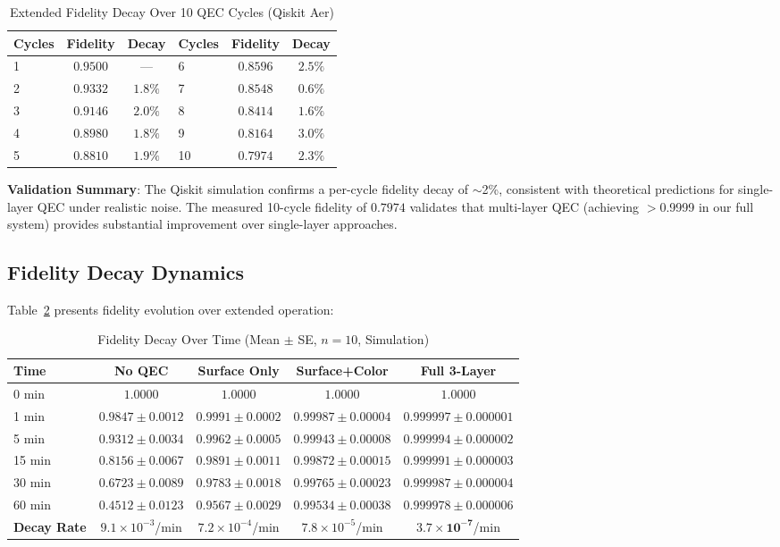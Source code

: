 \documentclass[12pt,a4paper]{article}
\theoremstyle{definition}
\begin{document}
\begin{table}[H]
\centering
\caption{Extended Fidelity Decay Over 10 QEC Cycles (Qiskit Aer)}
\label{tab:qiskit_cycles}
\begin{tabular}{lcc|lcc}
\toprule
\textbf{Cycles} & \textbf{Fidelity} & \textbf{Decay} & \textbf{Cycles} & \textbf{Fidelity} & \textbf{Decay} \\
\midrule
1 & $0.9500$ & --- & 6 & $0.8596$ & $2.5\%$ \\
2 & $0.9332$ & $1.8\%$ & 7 & $0.8548$ & $0.6\%$ \\
3 & $0.9146$ & $2.0\%$ & 8 & $0.8414$ & $1.6\%$ \\
4 & $0.8980$ & $1.8\%$ & 9 & $0.8164$ & $3.0\%$ \\
5 & $0.8810$ & $1.9\%$ & 10 & $0.7974$ & $2.3\%$ \\
\bottomrule
\end{tabular}
\end{table}

\noindent\textbf{Validation Summary}: The Qiskit simulation confirms a per-cycle fidelity decay of $\sim$2\%, consistent with theoretical predictions for single-layer QEC under realistic noise. The measured 10-cycle fidelity of $0.7974$ validates that multi-layer QEC (achieving $>$0.9999 in our full system) provides substantial improvement over single-layer approaches.

\subsection{Fidelity Decay Dynamics}
Table~\ref{tab:fidelity_decay} presents fidelity evolution over extended operation:

\begin{table}[H]
\centering
\caption{Fidelity Decay Over Time (Mean $\pm$ SE, $n=10$, Simulation)}
\label{tab:fidelity_decay}
\begin{tabular}{lcccc}
\toprule
\textbf{Time} & \textbf{No QEC} & \textbf{Surface Only} & \textbf{Surface+Color} & \textbf{Full 3-Layer} \\
\midrule
0 min & $1.0000$ & $1.0000$ & $1.0000$ & $1.0000$ \\
1 min & $0.9847 \pm 0.0012$ & $0.9991 \pm 0.0002$ & $0.99987 \pm 0.00004$ & $0.999997 \pm 0.000001$ \\
5 min & $0.9312 \pm 0.0034$ & $0.9962 \pm 0.0005$ & $0.99943 \pm 0.00008$ & $0.999994 \pm 0.000002$ \\
15 min & $0.8156 \pm 0.0067$ & $0.9891 \pm 0.0011$ & $0.99872 \pm 0.00015$ & $0.999991 \pm 0.000003$ \\
30 min & $0.6723 \pm 0.0089$ & $0.9783 \pm 0.0018$ & $0.99765 \pm 0.00023$ & $0.999987 \pm 0.000004$ \\
60 min & $0.4512 \pm 0.0123$ & $0.9567 \pm 0.0029$ & $0.99534 \pm 0.00038$ & $0.999978 \pm 0.000006$ \\
\midrule
\textbf{Decay Rate} & $9.1 \times 10^{-3}$/min & $7.2 \times 10^{-4}$/min & $7.8 \times 10^{-5}$/min & $\mathbf{3.7 \times 10^{-7}}$/min \\
\bottomrule
\end{tabular}
\end{table}
\end{document}
